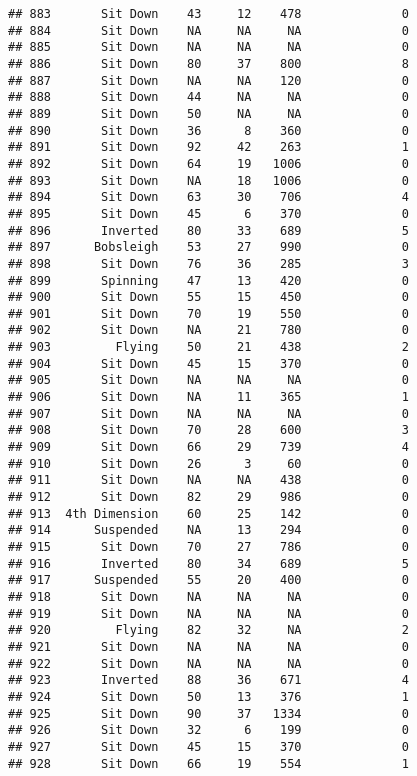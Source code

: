 \documentclass[
]{article}
\begin{document}
\begin{verbatim}
## 883       Sit Down    43     12    478              0
## 884       Sit Down    NA     NA     NA              0
## 885       Sit Down    NA     NA     NA              0
## 886       Sit Down    80     37    800              8
## 887       Sit Down    NA     NA    120              0
## 888       Sit Down    44     NA     NA              0
## 889       Sit Down    50     NA     NA              0
## 890       Sit Down    36      8    360              0
## 891       Sit Down    92     42    263              1
## 892       Sit Down    64     19   1006              0
## 893       Sit Down    NA     18   1006              0
## 894       Sit Down    63     30    706              4
## 895       Sit Down    45      6    370              0
## 896       Inverted    80     33    689              5
## 897      Bobsleigh    53     27    990              0
## 898       Sit Down    76     36    285              3
## 899       Spinning    47     13    420              0
## 900       Sit Down    55     15    450              0
## 901       Sit Down    70     19    550              0
## 902       Sit Down    NA     21    780              0
## 903         Flying    50     21    438              2
## 904       Sit Down    45     15    370              0
## 905       Sit Down    NA     NA     NA              0
## 906       Sit Down    NA     11    365              1
## 907       Sit Down    NA     NA     NA              0
## 908       Sit Down    70     28    600              3
## 909       Sit Down    66     29    739              4
## 910       Sit Down    26      3     60              0
## 911       Sit Down    NA     NA    438              0
## 912       Sit Down    82     29    986              0
## 913  4th Dimension    60     25    142              0
## 914      Suspended    NA     13    294              0
## 915       Sit Down    70     27    786              0
## 916       Inverted    80     34    689              5
## 917      Suspended    55     20    400              0
## 918       Sit Down    NA     NA     NA              0
## 919       Sit Down    NA     NA     NA              0
## 920         Flying    82     32     NA              2
## 921       Sit Down    NA     NA     NA              0
## 922       Sit Down    NA     NA     NA              0
## 923       Inverted    88     36    671              4
## 924       Sit Down    50     13    376              1
## 925       Sit Down    90     37   1334              0
## 926       Sit Down    32      6    199              0
## 927       Sit Down    45     15    370              0
## 928       Sit Down    66     19    554              1

\end{verbatim}
\end{document}
